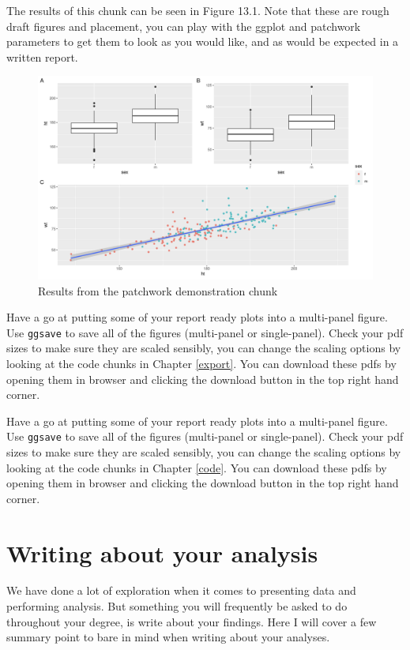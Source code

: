 \documentclass[
]{book}
\begin{document}
The results of this chunk can be seen in Figure 13.1. Note that these are rough draft figures and placement, you can play with the ggplot and patchwork parameters to get them to look as you would like, and as would be expected in a written report.

\begin{figure}
\includegraphics[width=0.9\linewidth]{figures/multipanel} \caption{Results from the patchwork demonstration chunk}\label{fig:unnamed-chunk-79}
\end{figure}

Have a go at putting some of your report ready plots into a multi-panel figure. Use \texttt{ggsave} to save all of the figures (multi-panel or single-panel). Check your pdf sizes to make sure they are scaled sensibly, you can change the scaling options by looking at the code chunks in Chapter \ref{export}. You can download these pdfs by opening them in browser and clicking the download button in the top right hand corner.

Have a go at putting some of your report ready plots into a multi-panel figure. Use \texttt{ggsave} to save all of the figures (multi-panel or single-panel). Check your pdf sizes to make sure they are scaled sensibly, you can change the scaling options by looking at the code chunks in Chapter \ref{code}. You can download these pdfs by opening them in browser and clicking the download button in the top right hand corner.

\hypertarget{analysis-writing}{%
\section{Writing about your analysis}\label{analysis-writing}}

We have done a lot of exploration when it comes to presenting data and performing analysis. But something you will frequently be asked to do throughout your degree, is write about your findings. Here I will cover a few summary point to bare in mind when writing about your analyses.
\end{document}
